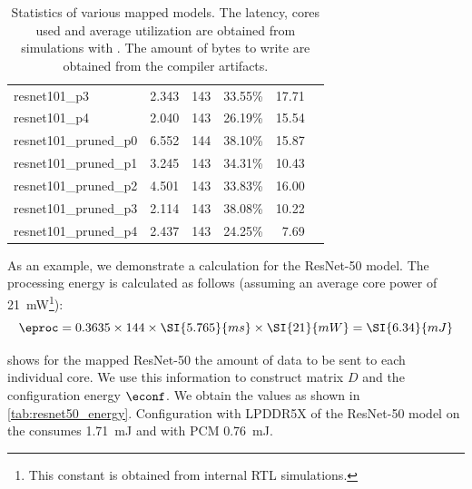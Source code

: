 \begin{table}[hbtp]
\begin{tabular}{@{}lrrrrr@{}}
resnet101\_p3           & 2.343                                                           & 143            & 33.55\%            & 17.71                                                             \\
resnet101\_p4           & 2.040                                                           & 143            & 26.19\%            & 15.54                                                             \\
resnet101\_pruned\_p0   & 6.552                                                           & 144            & 38.10\%            & 15.87                                                             \\
resnet101\_pruned\_p1   & 3.245                                                           & 143            & 34.31\%            & 10.43                                                             \\
resnet101\_pruned\_p2   & 4.501                                                           & 143            & 33.83\%            & 16.00                                                             \\
resnet101\_pruned\_p3   & 2.114                                                           & 143            & 38.08\%            & 10.22                                                             \\
resnet101\_pruned\_p4   & 2.437                                                           & 143            & 24.25\%            & 7.69                                                              \\
\bottomrule
\end{tabular}
\caption{
    Statistics of various mapped models.
    The latency, cores used and average utilization are obtained from simulations with \graipefruit{}.
    The amount of bytes to write are obtained from the compiler artifacts.
}
\label{tab:example_models_stats}
\end{table}

As an example, we demonstrate a calculation for the ResNet-50 model.
The processing energy is calculated as follows (assuming an average core power of \SI{21}{mW}\footnote{This constant is obtained from internal RTL simulations.}):
\begin{equation}
    \eproc = 0.3635 \times 144 \times \SI{5.765}{ms} \times \SI{21}{mW} = \SI{6.34}{mJ}
\end{equation}

 shows for the mapped ResNet-50 the amount of data to be sent to each individual core.
We use this information to construct matrix $D$ and the configuration energy $\econf$.
We obtain the values as shown in \cref{tab:resnet50_energy}.
Configuration with LPDDR5X of the ResNet-50 model on the \graicore{} consumes \SI{1.71}{mJ} and with PCM \SI{0.76}{mJ}.

